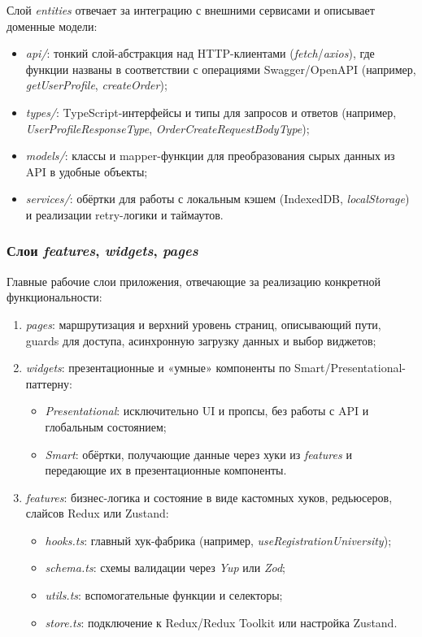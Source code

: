 Слой \textit{entities} отвечает за интеграцию с внешними сервисами и описывает доменные модели:
\begin{itemize}
  \item \textit{api/}: тонкий слой-абстракция над HTTP-клиентами (\textit{fetch}/\textit{axios}), где функции названы в соответствии с операциями Swagger/OpenAPI (например, \textit{getUserProfile}, \textit{createOrder});
  \item \textit{types/}: TypeScript-интерфейсы и типы для запросов и ответов (например, \textit{UserProfileResponseType}, \textit{OrderCreateRequestBodyType});
  \item \textit{models/}: классы и mapper-функции для преобразования сырых данных из API в удобные объекты;
  \item \textit{services/}: обёртки для работы с локальным кэшем (IndexedDB, \textit{localStorage}) и реализации retry-логики и таймаутов.
\end{itemize}

\subsubsection{Слои \textit{features}, \textit{widgets}, \textit{pages}}

Главные рабочие слои приложения, отвечающие за реализацию конкретной функциональности:
\begin{enumerate}
  \item \textit{pages}: маршрутизация и верхний уровень страниц, описывающий пути, guards для доступа, асинхронную загрузку данных и выбор виджетов;
  \item \textit{widgets}: презентационные и «умные» компоненты по Smart/Presentational-паттерну:
    \begin{itemize}
      \item \emph{Presentational}: исключительно UI и пропсы, без работы с API и глобальным состоянием;
      \item \emph{Smart}: обёртки, получающие данные через хуки из \textit{features} и передающие их в презентационные компоненты.
    \end{itemize}
  \item \textit{features}: бизнес-логика и состояние в виде кастомных хуков, редьюсеров, слайсов Redux или Zustand:
    \begin{itemize}
      \item \textit{hooks.ts}: главный хук-фабрика (например, \textit{useRegistrationUniversity});
      \item \textit{schema.ts}: схемы валидации через \textit{Yup} или \textit{Zod};
      \item \textit{utils.ts}: вспомогательные функции и селекторы;
      \item \textit{store.ts}: подключение к Redux/Redux Toolkit или настройка Zustand.
    \end{itemize}
\end{enumerate}

